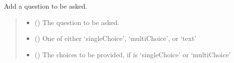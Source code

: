 \documentclass[letterpaper,10pt,english]{sphinxmanual}
\begin{document}
\begin{fulllineitems}
\begin{fulllineitems}
\label{\detokenize{aisquared.config.feedback:aisquared.config.feedback.ModelFeedback.ModelFeedback.add_question}}
\pysigstartsignatures
{}
\pysigstopsignatures
\sphinxAtStartPar
Add a question to be asked.
\begin{quote}\begin{description}
\begin{itemize}
\item {} 
\sphinxAtStartPar
{} () \textendash{} The question to be asked.

\item {} 
\sphinxAtStartPar
{} (\sphinxstyleliteralemphasis{\sphinxupquote{ (}}\sphinxstyleliteralemphasis{\sphinxupquote{)}}) \textendash{} One of either ‘singleChoice’, ‘multiChoice’, or ‘text’

\item {} 
\sphinxAtStartPar
{} (\sphinxstyleliteralemphasis{\sphinxupquote{ (}}\sphinxstyleliteralemphasis{\sphinxupquote{ {[}}}\sphinxstyleliteralemphasis{\sphinxupquote{{]}}}\sphinxstyleliteralemphasis{\sphinxupquote{)}}) \textendash{} The choices to be provided, if  is ‘singleChoice’ or ‘multiChoice’

\end{itemize}

\end{description}\end{quote}

\end{fulllineitems}


\end{fulllineitems}
\end{document}
